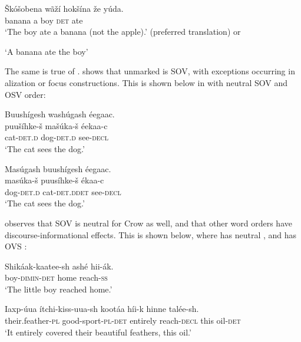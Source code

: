 \documentclass[output=paper]{LSP/langsci}
\begin{document}
\begin{exe}
\ex\label{ex:jrs:22}	\gll  \v{S}k\'o\v{s}obena wã\v{z}í 	hok\v{s}ína 	\v{z}e 		y\'uda. \\
banana 		a 			boy 	\textsc{det} 	ate \\
\trans `The boy ate a banana (not the apple).' (preferred translation) or 

`A banana ate the boy'  \citep[49]{West2003} 
\end{exe}

The same is true of .  \citet{Boyle2007} shows that unmarked  is SOV, with exceptions occurring in alization or focus constructions.  This is shown below in  with neutral SOV  and  OSV order:

\begin{exe}
\ex\label{ex:jrs:23} 
\glll Buushígesh wash\'ugash éegaac.\\
puu\v{s}íhke-\v{s}  ma\v{s}\'uka-\v{s} éekaa-c \\
cat-\textsc{det.d} dog-\textsc{det.d} see-\textsc{decl}  \\
\trans `The cat sees the dog.'  \citep[214]{Boyle2007}

\ex\label{ex:jrs:24} 
\glll Mas\'ugash 		buushígesh 	éegaac.\\
mas\'uka-\v{s} 		puusíhke-\v{s} 	ékaa-c \\
dog-\textsc{det.d} 		cat-\textsc{det.d}\textsc{det}	see-\textsc{decl} \\
\trans `The cat sees the dog.' \citep[214]{Boyle2007}

\end{exe}
	
\citet{Graczyk1991a} observes that SOV is neutral  for Crow as well, and that other word orders have discourse-informational effects.  This is shown below, where  has neutral , and  has OVS :

\let\eachwordtwo=\upshape

\begin{exe}
\ex\label{ex:jrs:25} \gll Shikáak-kaatee-sh ashé 		hii-ák. \\
boy-\textsc{dimin-det} 		home 	reach-\textsc{ss} \\
\trans `The little boy reached home.' \citep[101]{Graczyk1991a}

\ex\label{ex:jrs:26} \gll Iaxp-\'uua 		ítchi-kiss-uua-sh			kootáa 	híi-k 	hinne		talée-sh. \\
their.feather-\textsc{pl} good-sport-\textsc{pl}-\textsc{det}		entirely 	reach-\textsc{decl}	this 	oil-\textsc{det} \\
\trans `It entirely covered their beautiful feathers, this oil.' \citep[103]{Graczyk1991a}
\end{exe}
\end{document}
